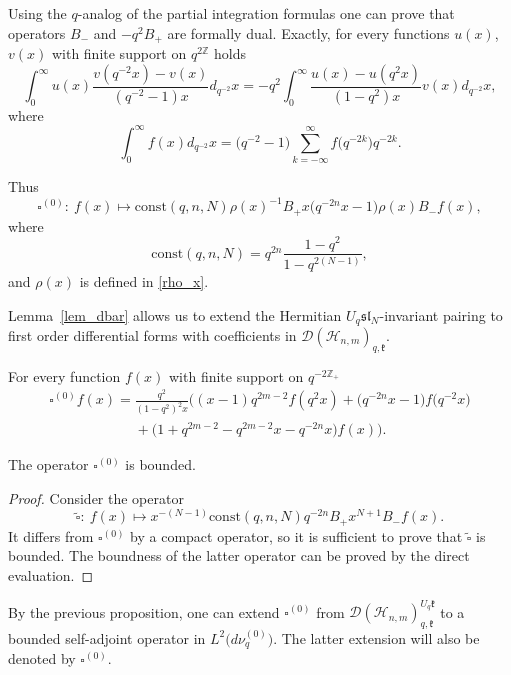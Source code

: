 \documentclass[pdftex]{sigma}
\begin{document}
Using the $q$-analog of the partial integration formulas one can prove that operators $B_-$ and $-q^2 B_+$
are formally dual. Exactly, for every functions $u(x)$, $v(x)$ with f\/inite support on $q^{2\mathbb{Z}}$ holds
\[ \int_0^\infty u(x) \frac{v(q^{-2}x)-v(x)}{(q^{-2}-1)x} d_{q^{-2}} x = -q^2 \int_0^\infty
\frac{u(x)-u(q^2x)}{(1-q^2)x} v(x) d_{q^{-2}} x,
\]
where
\[
\int_0^\infty f(x) d_{q^{-2}} x = \big(q^{-2} - 1\big)
\sum\limits_{k=-\infty}^\infty f\big(q^{-2k}\big) q^{-2k}.
\]

Thus
\[
\square^{(0)}: \ f(x) \mapsto \mathrm{const}(q, n, N) \rho(x)^{-1} B_+ x \big(q^{-2n} x - 1\big) \rho(x) B_- f(x),
\]
where
\[
\mathrm{const}(q, n, N) = q^{2n} \frac{1-q^2}{1-q^{2(N-1)}},
\]
and $\rho(x)$ is def\/ined in \eqref{rho_x}.

Lemma~\ref{lem_dbar} allows us to extend the Hermitian $U_q
\mathfrak{sl}_N$-invariant pairing to f\/irst order dif\/ferential forms with
coef\/f\/icients in $\mathscr{D}(\mathscr{H}_{n,m})_{q,\mathfrak{k}}$.

\begin{lemma}
For every function $f(x)$ with finite support on $q^{-2\mathbb{Z}_+}$
\begin{gather*}
\square^{(0)} f(x) = \frac{q^2}{(1-q^2)^2x} \big((x-1)q^{2m-2}f(q^2x) +
\big(q^{-2n}x-1\big)f\big(q^{-2}x\big)\\
\phantom{\square^{(0)} f(x) =}{}
+\big(1+q^{2m-2}-q^{2m-2}x-q^{-2n}x\big)f(x)\big).
\end{gather*}
\end{lemma}

\begin{proposition}\label{cont_spec}
The operator $\square^{(0)}$ is bounded.
\end{proposition}

\begin{proof} Consider the operator
\[
\widetilde{\square} : \ f(x) \mapsto x^{-(N-1)} \mathrm{const}(q, n, N) q^{-2n} B_+ x^{N+1} B_-f(x).
\]
It dif\/fers from $\square^{(0)}$ by a compact operator, so it is suf\/f\/icient to prove that
$\widetilde{\square}$ is bounded. The boundness of the latter operator can be proved by the direct
evaluation.
\end{proof}

By the previous proposition, one can extend $\square^{(0)}$ from
$\mathscr{D}(\mathscr{H}_{n,m})_{q,\mathfrak{k}}^{U_q \mathfrak{k}}$ to a bounded self-adjoint operator in
$L^2\big(d\nu_q^{(0)}\big)$. The latter extension will also be denoted by $\square^{(0)}$.
\end{document}
